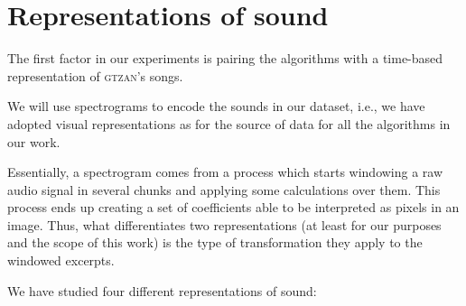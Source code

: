 \label{chap:design}

\section{Representations of sound}

The first factor in our experiments is pairing the algorithms with a time-based representation of \textsc{gtzan}'s songs.

We will use spectrograms to encode the sounds in our dataset, i.e., we have adopted visual representations as for the source of data for all the algorithms in our work.

Essentially, a spectrogram comes from a process which starts windowing a raw audio signal in several chunks and applying some calculations over them. This process ends up creating a set of coefficients able to be interpreted as pixels in an image. Thus, what differentiates two representations (at least for our purposes and the scope of this work) is the type of transformation they apply to the windowed excerpts.

We have studied four different representations of sound:


